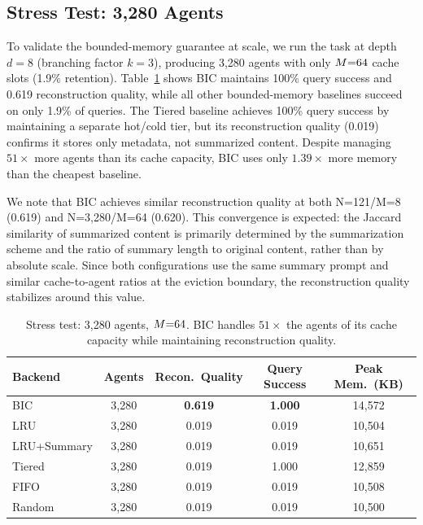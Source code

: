 \subsection{Stress Test: 3{,}280 Agents}
\label{sec:stress}

To validate the bounded-memory guarantee at scale, we run the task at
depth $d{=}8$ (branching factor $k{=}3$), producing 3{,}280 agents
with only $M{=}64$ cache slots (1.9\% retention).
Table~\ref{tab:stress} shows BIC maintains 100\% query success and
0.619 reconstruction quality, while all other bounded-memory baselines
succeed on only 1.9\% of queries.  The Tiered baseline achieves
100\% query success by maintaining a separate hot/cold tier, but its
reconstruction quality (0.019) confirms it stores only metadata, not
summarized content.  Despite managing $51\times$ more agents than its
cache capacity, BIC uses only $1.39\times$ more memory than the
cheapest baseline.

We note that BIC achieves similar reconstruction quality at both N=121/M=8 (0.619) and N=3{,}280/M=64 (0.620). This convergence is expected: the Jaccard similarity of summarized content is primarily determined by the summarization scheme and the ratio of summary length to original content, rather than by absolute scale. Since both configurations use the same summary prompt and similar cache-to-agent ratios at the eviction boundary, the reconstruction quality stabilizes around this value.

\begin{table}[t]
\centering
\caption{Stress test: 3{,}280 agents, $M{=}64$.  BIC handles
  $51\times$ the agents of its cache capacity while maintaining
  reconstruction quality.}
\label{tab:stress}
\vspace{0.3em}
\begin{tabular}{lcccc}
\toprule
\textbf{Backend} & \textbf{Agents} & \textbf{Recon.\ Quality} &
\textbf{Query Success} & \textbf{Peak Mem.\ (KB)} \\
\midrule
BIC          & 3{,}280 & \textbf{0.619} & \textbf{1.000} & 14{,}572 \\
LRU          & 3{,}280 & 0.019 & 0.019 & 10{,}504 \\
LRU+Summary  & 3{,}280 & 0.019 & 0.019 & 10{,}651 \\
Tiered       & 3{,}280 & 0.019 & 1.000 & 12{,}859 \\
FIFO         & 3{,}280 & 0.019 & 0.019 & 10{,}508 \\
Random       & 3{,}280 & 0.019 & 0.019 & 10{,}500 \\
\bottomrule
\end{tabular}
\end{table}


